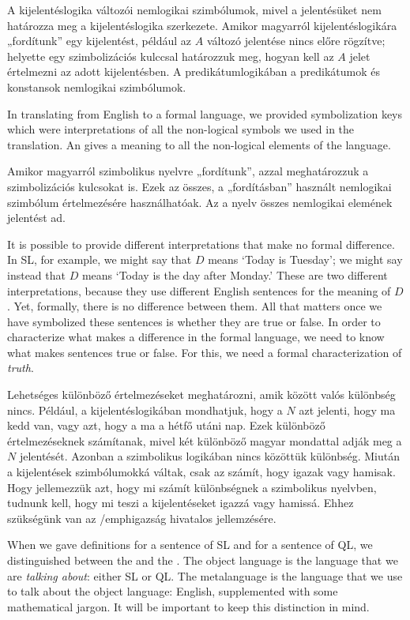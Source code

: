 A kijelentéslogika változói nemlogikai szimbólumok, mivel a jelentésüket nem határozza meg a kijelentéslogika szerkezete. Amikor magyarról kijelentéslogikára „fordítunk” egy kijelentést, például az $A$ változó jelentése nincs előre rögzítve; helyette egy szimbolizációs kulccsal határozzuk meg, hogyan kell az $A$ jelet értelmezni az adott kijelentésben. A predikátumlogikában a predikátumok és konstansok nemlogikai szimbólumok.


In translating from English to a formal language, we provided symbolization keys which were interpretations of all the non-logical symbols we used in the translation. An  gives a meaning to all the non-logical elements of the language.

Amikor magyarról szimbolikus nyelvre „fordítunk”, azzal meghatározzuk a szimbolizációs kulcsokat is. Ezek az összes, a „fordításban” használt nemlogikai szimbólum értelmezésére használhatóak. Az  a nyelv összes nemlogikai elemének jelentést ad.
 

It is possible to provide different interpretations that make no formal difference. In SL, for example, we might say that $D$ means `Today is Tuesday'; we might say instead that $D$ means `Today is the day after Monday.' These are two different interpretations, because they use different English sentences for the meaning of $D$. Yet, formally, there is no difference between them. All that matters once we have symbolized these sentences is whether they are true or false. In order to characterize what makes a difference in the formal language, we need to know what makes sentences true or false. For this, we need a formal characterization of \emph{truth}.

Lehetséges különböző értelmezéseket meghatározni, amik között valós különbség nincs. Például, a kijelentéslogikában mondhatjuk, hogy a $N$ azt jelenti, hogy ma kedd van, vagy azt, hogy a ma a hétfő utáni nap. Ezek különböző értelmezéseknek számítanak, mivel két különböző magyar mondattal adják meg a $N$ jelentését. Azonban a szimbolikus logikában nincs közöttük különbség. Miután a kijelentések szimbólumokká váltak, csak az számít, hogy igazak vagy hamisak. Hogy jellemezzük azt, hogy mi számít különbségnek a szimbolikus nyelvben, tudnunk kell, hogy mi teszi a kijelentéseket igazzá vagy hamissá. Ehhez szükségünk van az /emph{igazság} hivatalos jellemzésére.


When we gave definitions for a sentence of SL and for a sentence of QL, we distinguished between the  and the . The object language is the language that we are \emph{talking about}: either SL or QL. The metalanguage is the language that we use to talk about the object language: English, supplemented with some mathematical jargon. It will be important to keep this distinction in mind.


